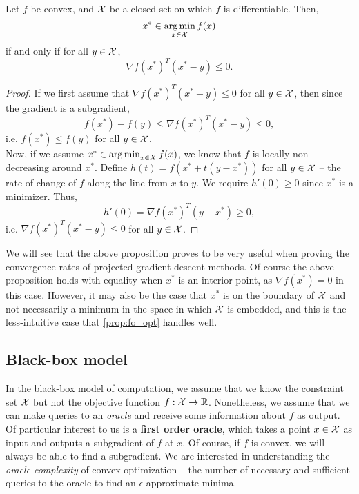 \begin{proposition}\label{prop:fo_opt}
Let $f$ be convex, and $\mathcal{X}$ be a closed set on which $f$ is differentiable. Then,
\[
x^* \in \operatorname*{arg\,min}_{x \in \mathcal{X}} f(x)
\]
if and only if for all $y \in \mathcal{X}$,
\[
\nabla f(x^*)^T (x^* - y) \leq 0.
\]
\begin{proof}
If we first assume that $\nabla f(x^*)^T(x^* - y) \leq 0$ for all $y \in \mathcal{X}$, then since the gradient is a subgradient,
\[
f(x^*) - f(y) \leq \nabla f(x^*)^T (x^* - y) \leq 0,
\]
i.e. $f(x^*) \leq f(y)$ for all $y \in \mathcal{X}$. \\

Now, if we assume $x^* \in \operatorname*{arg\,min}_{x \in X}f(x)$, we know that $f$ is locally non-decreasing around $x^*$. Define $h(t) = f(x^* + t(y-x^*))$ for all $y \in \mathcal{X}$ -- the rate of change of $f$ along the line from $x$ to $y$. We require $h'(0) \geq 0$ since $x^*$ is a minimizer. Thus,
\[
h'(0) = \nabla f(x^*)^T (y - x^*) \geq 0, 
\]
i.e. $\nabla f(x^*)^T (x^* - y) \leq 0$ for all $y \in \mathcal{X}$. 
\end{proof}
\end{proposition}

We will see that the above proposition proves to be very useful when proving the convergence rates of projected gradient descent methods. Of course the above proposition holds with equality when $x^*$ is an interior point, as $\nabla f(x^*) = 0$ in this case. However, it may also be the case that $x^*$ is on the boundary of $\mathcal{X}$ and not necessarily a minimum in the space in which $\mathcal{X}$ is embedded, and this is the less-intuitive case that \autoref{prop:fo_opt} handles well.

\subsection{Black-box model}
In the black-box model of computation, we assume that we know the constraint set $\mathcal{X}$ but not the objective function $f : \mathcal{X} \rightarrow \mathbb{R}$. Nonetheless, we assume that we can make queries to an \emph{oracle} and receive some information about $f$ as output. Of particular interest to us is a \textbf{first order oracle}, which takes a point $x \in \mathcal{X}$ as input and outputs a subgradient of $f$ at $x$. Of course, if $f$ is convex, we will always be able to find a subgradient. We are interested in understanding the \emph{oracle complexity} of convex optimization -- the number of necessary and sufficient queries to the oracle to find an $\epsilon$-approximate minima. 

